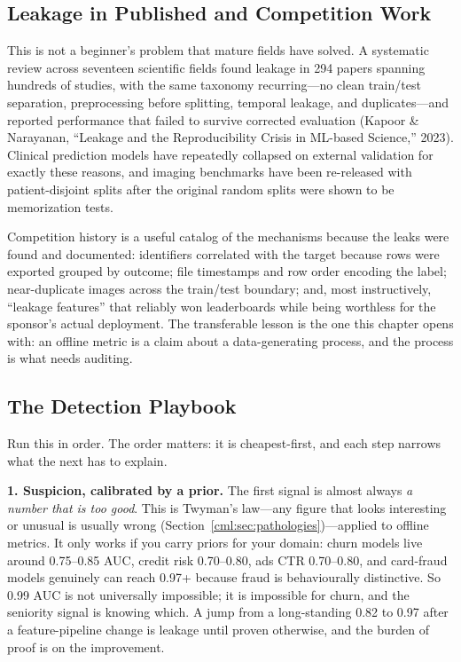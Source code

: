 \subsection{Leakage in Published and Competition Work}

This is not a beginner's problem that mature fields have solved. A systematic review across seventeen scientific fields found leakage in 294 papers spanning hundreds of studies, with the same taxonomy recurring---no clean train/test separation, preprocessing before splitting, temporal leakage, and duplicates---and reported performance that failed to survive corrected evaluation (Kapoor \& Narayanan, ``Leakage and the Reproducibility Crisis in ML-based Science,'' 2023). Clinical prediction models have repeatedly collapsed on external validation for exactly these reasons, and imaging benchmarks have been re-released with patient-disjoint splits after the original random splits were shown to be memorization tests.

Competition history is a useful catalog of the mechanisms because the leaks were found and documented: identifiers correlated with the target because rows were exported grouped by outcome; file timestamps and row order encoding the label; near-duplicate images across the train/test boundary; and, most instructively, ``leakage features'' that reliably won leaderboards while being worthless for the sponsor's actual deployment. The transferable lesson is the one this chapter opens with: an offline metric is a claim about a data-generating process, and the process is what needs auditing.

\subsection{The Detection Playbook}

Run this in order. The order matters: it is cheapest-first, and each step narrows what the next has to explain.

\textbf{1. Suspicion, calibrated by a prior.} The first signal is almost always \emph{a number that is too good}. This is Twyman's law---any figure that looks interesting or unusual is usually wrong (Section~\ref{cml:sec:pathologies})---applied to offline metrics. It only works if you carry priors for your domain: churn models live around 0.75--0.85 AUC, credit risk 0.70--0.80, ads CTR 0.70--0.80, and card-fraud models genuinely can reach 0.97+ because fraud is behaviourally distinctive. So 0.99 AUC is not universally impossible; it is impossible for churn, and the seniority signal is knowing which. A jump from a long-standing 0.82 to 0.97 after a feature-pipeline change is leakage until proven otherwise, and the burden of proof is on the improvement.

